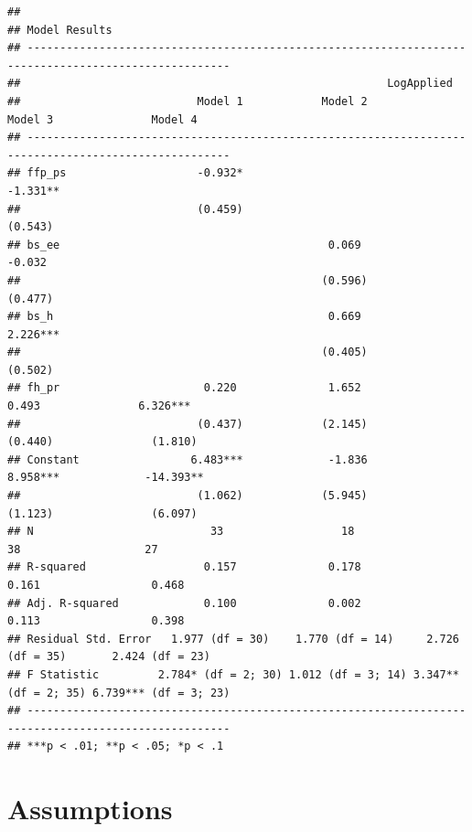 \documentclass[]{elsarticle} %
\begin{document}
\begin{verbatim}
## 
## Model Results
## -----------------------------------------------------------------------------------------------------
##                                                        LogApplied                                    
##                           Model 1            Model 2             Model 3               Model 4       
## -----------------------------------------------------------------------------------------------------
## ffp_ps                    -0.932*                                -1.331**                            
##                           (0.459)                                (0.543)                             
## bs_ee                                         0.069                                    -0.032        
##                                              (0.596)                                   (0.477)       
## bs_h                                          0.669                                   2.226***       
##                                              (0.405)                                   (0.502)       
## fh_pr                      0.220              1.652               0.493               6.326***       
##                           (0.437)            (2.145)             (0.440)               (1.810)       
## Constant                 6.483***             -1.836             8.958***             -14.393**      
##                           (1.062)            (5.945)             (1.123)               (6.097)       
## N                           33                  18                  38                   27          
## R-squared                  0.157              0.178               0.161                 0.468        
## Adj. R-squared             0.100              0.002               0.113                 0.398        
## Residual Std. Error   1.977 (df = 30)    1.770 (df = 14)     2.726 (df = 35)       2.424 (df = 23)   
## F Statistic         2.784* (df = 2; 30) 1.012 (df = 3; 14) 3.347** (df = 2; 35) 6.739*** (df = 3; 23)
## -----------------------------------------------------------------------------------------------------
## ***p < .01; **p < .05; *p < .1
\end{verbatim}

\section{Assumptions}\label{assumptions}
\end{document}
